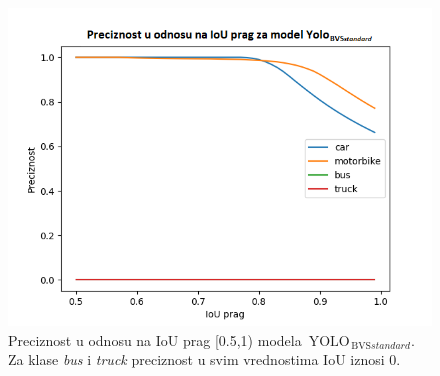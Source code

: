 \documentclass[12pt,oneside]{memoir}
\newcommand{\yolo}{\ensuremath{\,\textrm{YOLO}}}
\newcommand{\bvs}{\ensuremath{\,\textrm{BVS}}}
\begin{document}
\begin{figure}[!ht]
    \centering
    \includegraphics[width=1\textwidth]{matfmaster/glava4/precision_vs_iou_threshold_BASaugment.png}
    \caption{Preciznost u odnosu na IoU prag [0.5,1) modela $\yolo_{\bvs{standard}}$. Za klase \textit{bus} i \textit{truck} preciznost u svim vrednostima IoU iznosi 0.}
    \label{fig:section4_yolo4baseaug_prc}
\end{figure}
\end{document}
